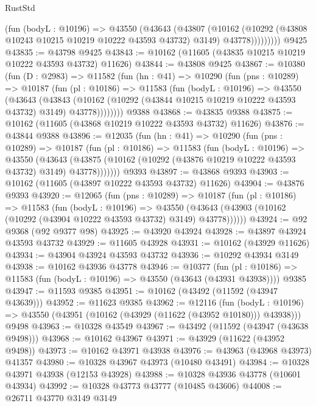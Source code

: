 \begin{lexlean}{RustStd}
\begin{coremodule}
              (fun (bodyL : @10196) =>
              @43550
                (@43643
                  (@43807
                    (@10162
                      (@10292 (@43808 @10243 @10215 @10219 @10222 @43593 @43732) @3149)
                      @43778)))))))))
    @9425
@43835 := @43798 @9425
@43843 := @10162 (@11605 (@43835 @10215 @10219 @10222 @43593 @43732) @11626)
@43844 := @43808 @9425
@43867 := @10380
    (fun (D : @2983) =>
    @11582
      (fun (hn : @41) =>
      @10290
        (fun (pns : @10289) =>
        @10187
          (fun (pl : @10186) =>
          @11583
            (fun (bodyL : @10196) =>
            @43550
              (@43643
                (@43843
                  (@10162 (@10292 (@43844 @10215 @10219 @10222 @43593 @43732) @3149) @43778))))))))
    @9388
@43868 := @43835 @9388
@43875 := @10162 (@11605 (@43868 @10219 @10222 @43593 @43732) @11626)
@43876 := @43844 @9388
@43896 := @12035
    (fun (hn : @41) =>
    @10290
      (fun (pns : @10289) =>
      @10187
        (fun (pl : @10186) =>
        @11583
          (fun (bodyL : @10196) =>
          @43550
            (@43643
              (@43875 (@10162 (@10292 (@43876 @10219 @10222 @43593 @43732) @3149) @43778)))))))
    @9393
@43897 := @43868 @9393
@43903 := @10162 (@11605 (@43897 @10222 @43593 @43732) @11626)
@43904 := @43876 @9393
@43920 := @12065
    (fun (pns : @10289) =>
    @10187
      (fun (pl : @10186) =>
      @11583
        (fun (bodyL : @10196) =>
        @43550 (@43643 (@43903 (@10162 (@10292 (@43904 @10222 @43593 @43732) @3149) @43778))))))
@43924 := @92 @9368 (@92 @9377 @98)
@43925 := @43920 @43924
@43928 := @43897 @43924 @43593 @43732
@43929 := @11605 @43928
@43931 := @10162 (@43929 @11626)
@43934 := @43904 @43924 @43593 @43732
@43936 := @10292 @43934 @3149
@43938 := @10162 @43936 @43778
@43946 := @10377
    (fun (pl : @10186) => @11583 (fun (bodyL : @10196) => @43550 (@43643 (@43931 @43938))))
    @9385
@43947 := @11593 @9385
@43951 := @10162 (@43492 (@11592 (@43947 @43639)))
@43952 := @11623 @9385
@43962 := @12116
    (fun (bodyL : @10196) => @43550 (@43951 (@10162 (@43929 (@11622 (@43952 @10180))) @43938)))
    @9498
@43963 := @10328 @43549
@43967 := @43492 (@11592 (@43947 (@43638 @9498)))
@43968 := @10162 @43967
@43971 := @43929 (@11622 (@43952 @9498))
@43973 := @10162 @43971 @43938
@43976 := @43963 (@43968 @43973) @41357
@43980 := @10328 @43967 @43973 (@10480 @43491)
@43984 := @10328 @43971 @43938 (@12153 @43928)
@43988 := @10328 @43936 @43778 (@10601 @43934)
@43992 := @10328 @43773 @43777 (@10485 @43606)
@44008 := @26711
    @43770
    @3149
    @3149

\end{coremodule}
\end{lexlean}
